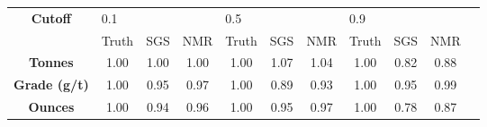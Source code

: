 \begin{tabular}{ccccccccccc}
\toprule
\textbf{Cutoff} & \multicolumn{3}{l}{0.1} & \multicolumn{3}{l}{0.5} & \multicolumn{3}{l}{0.9} \\
{} & Truth &  SGS &  NMR & Truth &  SGS &  NMR & Truth &  SGS &  NMR \\
\midrule
\textbf{Tonnes     } &  1.00 & 1.00 & 1.00 &  1.00 & 1.07 & 1.04 &  1.00 & 0.82 & 0.88 \\
\textbf{Grade (g/t)} &  1.00 & 0.95 & 0.97 &  1.00 & 0.89 & 0.93 &  1.00 & 0.95 & 0.99 \\
\textbf{Ounces     } &  1.00 & 0.94 & 0.96 &  1.00 & 0.95 & 0.97 &  1.00 & 0.78 & 0.87 \\
\bottomrule
\end{tabular}
